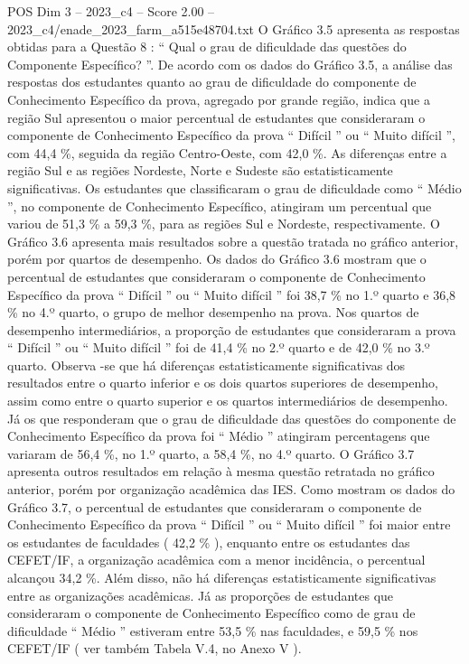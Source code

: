 \begin{textsample}{POS Dim 3 – 2023\_c4 – Score 2.00 – 2023\_c4/enade\_2023\_farm\_a515e48704.txt}
O Gráfico 3.5 apresenta as respostas obtidas para a Questão 8 : “ Qual o grau de dificuldade das questões do Componente Específico? ”.
De acordo com os dados do Gráfico 3.5, a análise das respostas dos estudantes quanto ao grau de dificuldade do componente de Conhecimento Específico da prova, agregado por grande região, indica que a região Sul apresentou o maior percentual de estudantes que consideraram o componente de Conhecimento Específico da prova “ Difícil ” ou “ Muito difícil ”, com 44,4 \%, seguida da região Centro-Oeste, com 42,0 \%.
As diferenças entre a região Sul e as regiões Nordeste, Norte e Sudeste são estatisticamente significativas.
Os estudantes que classificaram o grau de dificuldade como “ Médio ”, no componente de Conhecimento Específico, atingiram um percentual que variou de 51,3 \% a 59,3 \%, para as regiões Sul e Nordeste, respectivamente.
O Gráfico 3.6 apresenta mais resultados sobre a questão tratada no gráfico anterior, porém por quartos de desempenho.
Os dados do Gráfico 3.6 mostram que o percentual de estudantes que consideraram o componente de Conhecimento Específico da prova “ Difícil ” ou “ Muito difícil ” foi 38,7 \% no 1.º quarto e 36,8 \% no 4.º quarto, o grupo de melhor desempenho na prova.
Nos quartos de desempenho intermediários, a proporção de estudantes que consideraram a prova “ Difícil ” ou “ Muito difícil ” foi de 41,4 \% no 2.º quarto e de 42,0 \% no 3.º quarto.
Observa -se que há diferenças estatisticamente significativas dos resultados entre o quarto inferior e os dois quartos superiores de desempenho, assim como entre o quarto superior e os quartos intermediários de desempenho.
Já os que responderam que o grau de dificuldade das questões do componente de Conhecimento Específico da prova foi “ Médio ” atingiram percentagens que variaram de 56,4 \%, no 1.º quarto, a 58,4 \%, no 4.º quarto.
O Gráfico 3.7 apresenta outros resultados em relação à mesma questão retratada no gráfico anterior, porém por organização acadêmica das IES.
Como mostram os dados do Gráfico 3.7, o percentual de estudantes que consideraram o componente de Conhecimento Específico da prova “ Difícil ” ou “ Muito difícil ” foi maior entre os estudantes de faculdades ( 42,2 \% ), enquanto entre os estudantes das CEFET/IF, a organização acadêmica com a menor incidência, o percentual alcançou 34,2 \%.
Além disso, não há diferenças estatisticamente significativas entre as organizações acadêmicas.
Já as proporções de estudantes que consideraram o componente de Conhecimento Específico como de grau de dificuldade “ Médio ” estiveram entre 53,5 \% nas faculdades, e 59,5 \% nos CEFET/IF ( ver também Tabela V.4, no Anexo V ).

\end{textsample}

